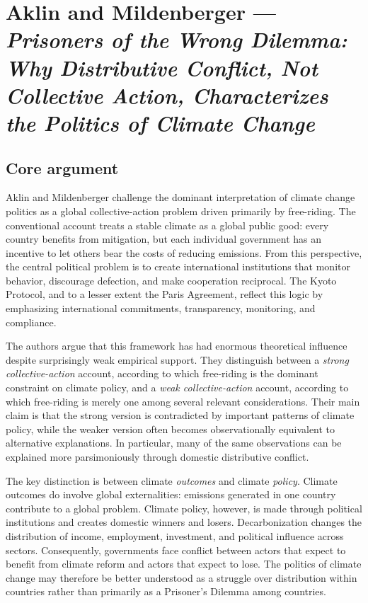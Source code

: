 
\clearpage
\section{Aklin and Mildenberger --- \textit{Prisoners of the Wrong Dilemma: Why Distributive Conflict, Not Collective Action, Characterizes the Politics of Climate Change}}

\subsection{Core argument}

Aklin and Mildenberger challenge the dominant interpretation of climate change politics as a global collective-action problem driven primarily by free-riding. The conventional account treats a stable climate as a global public good: every country benefits from mitigation, but each individual government has an incentive to let others bear the costs of reducing emissions. From this perspective, the central political problem is to create international institutions that monitor behavior, discourage defection, and make cooperation reciprocal. The Kyoto Protocol, and to a lesser extent the Paris Agreement, reflect this logic by emphasizing international commitments, transparency, monitoring, and compliance.

The authors argue that this framework has had enormous theoretical influence despite surprisingly weak empirical support. They distinguish between a \textit{strong collective-action} account, according to which free-riding is the dominant constraint on climate policy, and a \textit{weak collective-action} account, according to which free-riding is merely one among several relevant considerations. Their main claim is that the strong version is contradicted by important patterns of climate policy, while the weaker version often becomes observationally equivalent to alternative explanations. In particular, many of the same observations can be explained more parsimoniously through domestic distributive conflict.

The key distinction is between climate \textit{outcomes} and climate \textit{policy}. Climate outcomes do involve global externalities: emissions generated in one country contribute to a global problem. Climate policy, however, is made through political institutions and creates domestic winners and losers. Decarbonization changes the distribution of income, employment, investment, and political influence across sectors. Consequently, governments face conflict between actors that expect to benefit from climate reform and actors that expect to lose. The politics of climate change may therefore be better understood as a struggle over distribution within countries rather than primarily as a Prisoner's Dilemma among countries.

